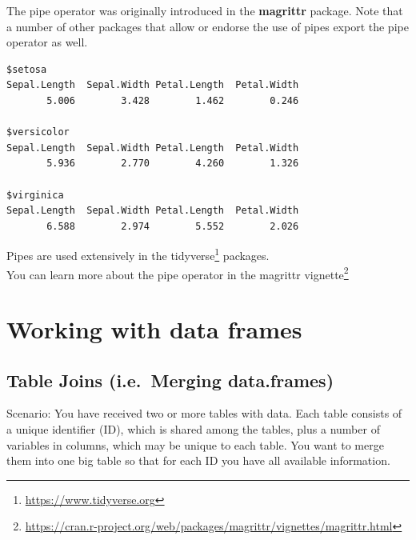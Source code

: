 \documentclass[
]{book}
\newenvironment{Shaded}{\begin{snugshade}}{\end{snugshade}}
\newcommand{\ControlFlowTok}[1]{\textcolor[rgb]{0.13,0.29,0.53}{\textbf{#1}}}
\newcommand{\DecValTok}[1]{\textcolor[rgb]{0.00,0.00,0.81}{#1}}
\newcommand{\FunctionTok}[1]{\textcolor[rgb]{0.00,0.00,0.00}{#1}}
\newcommand{\NormalTok}[1]{#1}
\newcommand{\OtherTok}[1]{\textcolor[rgb]{0.56,0.35,0.01}{#1}}
\newcommand{\SpecialCharTok}[1]{\textcolor[rgb]{0.00,0.00,0.00}{#1}}
\renewcommand{\href}[2]{#2\footnote{\url{#1}}}
\begin{document}
The pipe operator was originally introduced in the \textbf{magrittr} package. Note that a number of other packages that allow or endorse the use of pipes export the pipe operator as well.

\begin{Shaded}
\end{Shaded}

\begin{verbatim}
$setosa
Sepal.Length  Sepal.Width Petal.Length  Petal.Width 
       5.006        3.428        1.462        0.246 

$versicolor
Sepal.Length  Sepal.Width Petal.Length  Petal.Width 
       5.936        2.770        4.260        1.326 

$virginica
Sepal.Length  Sepal.Width Petal.Length  Petal.Width 
       6.588        2.974        5.552        2.026 
\end{verbatim}

Pipes are used extensively in the \href{https://www.tidyverse.org}{tidyverse} packages.\\
You can learn more about the pipe operator in the \href{https://cran.r-project.org/web/packages/magrittr/vignettes/magrittr.html}{magrittr vignette}

\hypertarget{dataframes}{%
\chapter{Working with data frames}\label{dataframes}}

\hypertarget{table-joins-i.e.-merging-data.frames}{%
\section{Table Joins (i.e.~Merging data.frames)}\label{table-joins-i.e.-merging-data.frames}}

Scenario: You have received two or more tables with data. Each table consists of a unique identifier (ID), which is shared among the tables, plus a number of variables in columns, which may be unique to each table. You want to merge them into one big table so that for each ID you have all available information.
\end{document}
